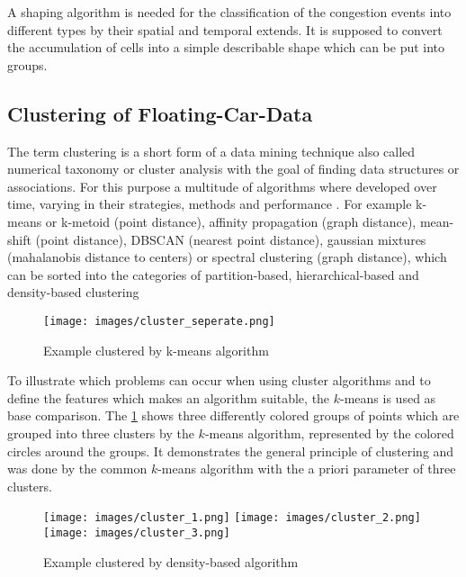 A shaping algorithm is needed for the classification of the congestion events into different types by their spatial and temporal extends. It is supposed to convert the accumulation of cells into a simple describable shape which can be put into groups.

\subsection{Clustering of Floating-Car-Data}
\label{methodology_detection_clustering}
The term clustering is a short form of a data mining technique also called numerical taxonomy or cluster analysis with the goal of finding data structures or associations. For this purpose a multitude of algorithms where developed over time, varying in their strategies, methods and performance \parencite{Busch2004}. For example k-means or k-metoid (point distance), affinity propagation (graph distance), mean-shift (point distance), DBSCAN (nearest point distance), gaussian mixtures (mahalanobis distance to centers) or spectral clustering (graph distance), which can be sorted into the categories of partition-based, hierarchical-based and density-based clustering \parencite{Chauhan2020,Yildirim2020}

\bigskip

\begin{figure}[ht!]
	\centering
	\texttt{[image: images/cluster\_seperate.png]}
	\caption{Example clustered by k-means algorithm \parencite{Yildirim2020}}
	\label{cluster_kmeans}
\end{figure}

To illustrate which problems can occur when using cluster algorithms and to define the features which makes an algorithm suitable, the $k$-means is used as base comparison. The \cref{cluster_kmeans} shows three differently colored groups of points which are grouped into three clusters by the $k$-means algorithm, represented by the colored circles around the groups. It demonstrates the general principle of clustering and was done by the common $k$-means algorithm with the a priori parameter of three clusters. 

\begin{figure}[ht!]
	\centering
	\texttt{[image: images/cluster\_1.png]}
	\texttt{[image: images/cluster\_2.png]}
	\texttt{[image: images/cluster\_3.png]}
	\caption{Example clustered by density-based algorithm \parencite{Yildirim2020}}
	\label{cluster_dbscan}
\end{figure}

